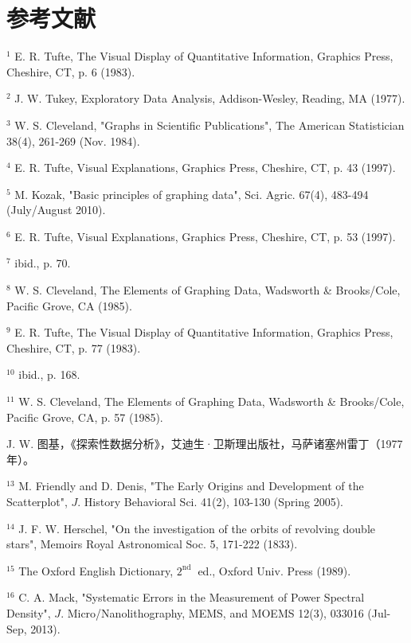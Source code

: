 \section*{参考文献}
${ }^{1}$ E. R. Tufte, The Visual Display of Quantitative Information, Graphics Press, Cheshire, CT, p. 6 (1983).

${ }^{2}$ J. W. Tukey, Exploratory Data Analysis, Addison-Wesley, Reading, MA (1977).

${ }^{3}$ W. S. Cleveland, "Graphs in Scientific Publications", The American Statistician 38(4), 261-269 (Nov. 1984).

${ }^{4}$ E. R. Tufte, Visual Explanations, Graphics Press, Cheshire, CT, p. 43 (1997).

${ }^{5}$ M. Kozak, "Basic principles of graphing data", Sci. Agric. 67(4), 483-494 (July/August 2010).

${ }^{6}$ E. R. Tufte, Visual Explanations, Graphics Press, Cheshire, CT, p. 53 (1997).

${ }^{7}$ ibid., p. 70.

${ }^{8}$ W. S. Cleveland, The Elements of Graphing Data, Wadsworth \& Brooks/Cole, Pacific Grove, CA (1985).

${ }^{9}$ E. R. Tufte, The Visual Display of Quantitative Information, Graphics Press, Cheshire, CT, p. 77 (1983).

${ }^{10}$ ibid., p. 168.

${ }^{11}$ W. S. Cleveland, The Elements of Graphing Data, Wadsworth \& Brooks/Cole, Pacific Grove, CA, p. 57 (1985).

J. W. 图基，《探索性数据分析》，艾迪生·卫斯理出版社，马萨诸塞州雷丁（1977年）。

${ }^{13}$ M. Friendly and D. Denis, "The Early Origins and Development of the Scatterplot", $J$. History Behavioral Sci. 41(2), 103-130 (Spring 2005).

${ }^{14}$ J. F. W. Herschel, "On the investigation of the orbits of revolving double stars", Memoirs Royal Astronomical Soc. 5, 171-222 (1833).

${ }^{15}$ The Oxford English Dictionary, $2^{\text{nd }}$ ed., Oxford Univ. Press (1989).

${ }^{16}$ C. A. Mack, "Systematic Errors in the Measurement of Power Spectral Density", $J$. Micro/Nanolithography, MEMS, and MOEMS 12(3), 033016 (Jul-Sep, 2013).

